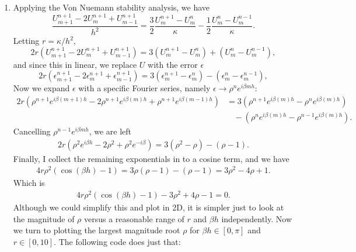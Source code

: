 \documentclass[11pt]{article}
\def\f{\frac }
\begin{document}
\begin{enumerate}
\item Applying the Von Nuemann stability analysis, we have
\[ \f{U_{m+1} ^{n+1}-2U_{m} ^{n+1}+U_{m-1} ^{n+1}}{h^2} = \f{3}{2} \f{U_{m} ^{n+1}-U_{m} ^{n}}{\kappa} - \f{1}{2} \f{U_{m} ^{n} - U_{m} ^{n-1}}{\kappa}. \]
Letting $r = \kappa/h^2$, 
\[ 2r \left ( U_{m+1} ^{n+1}-2U_{m} ^{n+1}+U_{m-1} ^{n+1}\right )  = 3\left ( U_{m} ^{n+1}-U_{m} ^{n} \right )  + \left ( U_{m} ^{n} - U_{m} ^{n-1} \right ), \]
and since this in linear, we replace $U$ with the error $\epsilon$ 
\[ 2r \left (\epsilon_{m+1} ^{n+1}-2\epsilon_{m} ^{n+1}+\epsilon_{m-1} ^{n+1}\right )  = 3\left ( \epsilon_{m} ^{n+1}-\epsilon_{m} ^{n} \right )  - \left ( \epsilon_{m} ^{n} - \epsilon_{m} ^{n-1} \right ), \]
Now we expand $\epsilon$ with a specific Fourier series, namely $\epsilon \to \rho ^n e^{i\beta m h}$:
\begin{align*} 2r \left (\rho ^{n+1} e ^{i \beta (m+1) h}-2\rho ^{n+1} e ^{i \beta (m) h}+\rho ^{n+1} e ^{i \beta (m-1) h}\right )  &= 3\left ( \rho ^{n+1} e ^{i \beta (m) h}-\rho ^{n} e ^{i \beta (m) h}\right ) \\
&~~~~- \left ( \rho ^{n} e ^{i \beta (m) h} - \rho ^{n-1} e ^{i \beta (m) h} \right ). \end{align*}
Cancelling $\rho ^{n-1} e^{i\beta m h}$, we are left
\begin{align*} 2r \left (\rho ^{2} e ^{i \beta h}-2\rho ^{2} +\rho ^{2} e ^{-i \beta }\right )  = 3\left ( \rho ^{2} -\rho \right )- \left ( \rho - 1\right ). \end{align*}
Finally, I collect the remaining exponentials in to a cosine term, and we have
\begin{align*} 4r\rho ^{2} \left ( \cos (\beta h)-1\right )  = 3\rho \left ( \rho -1\right )- \left ( \rho - 1\right ) = 3\rho ^2 -4\rho +1 . \end{align*}
Which is
\begin{align*} 4r\rho ^{2} \left ( \cos (\beta h)-1\right )  - 3\rho ^2 +4\rho -1  = 0. \end{align*}
Although we could simplify this and plot in 2D, it is simpler just to look at the magnitude of $\rho$ versus a reasonable range of $r$ and $\beta h$ independently.
Now we turn to plotting the largest magnitude root $\rho$ for $\beta h \in [0,\pi]$ and $r \in [0,10]$.
The following code does just that:




\end{enumerate}
\end{document}
